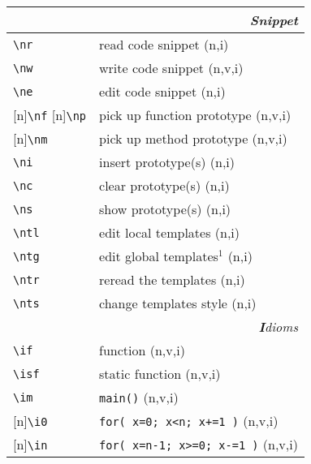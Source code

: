 \documentclass[oneside,11pt,landscape,DIV17]{scrartcl}
\newcommand{\Rep}{{\tiny{[n]}}}
\begin{document}
\begin{multicols}{3}
\begin{center}
%
\begin{tabular}[]{|p{11mm}|p{60mm}|}
\hline
\multicolumn{2}{|r|}{\textsl{S\textbf{n}ippet}} \\
\hline     \verb'\nr'  & read code snippet         \hfill (n,i)\\
\hline     \verb'\nw'  & write code snippet        \hfill (n,v,i)\\
\hline     \verb'\ne'  & edit code snippet         \hfill (n,i)\\
\hline \Rep\verb'\nf' \Rep\verb'\np'  & pick up function prototype         \hfill (n,v,i)\\
\hline \Rep\verb'\nm'  & pick up method prototype         \hfill (n,v,i)\\
\hline     \verb'\ni'  & insert prototype(s)       \hfill (n,i)\\
\hline     \verb'\nc'  & clear  prototype(s)       \hfill (n,i)\\
\hline     \verb'\ns'  & show   prototype(s)       \hfill (n,i)\\
%
\hline \verb'\ntl' & edit local templates      \hfill (n,i)\\
\hline \verb'\ntg' & edit global templates$^1$ \hfill (n,i)\\
\hline \verb'\ntr' & reread the templates      \hfill (n,i)\\
\hline \verb'\nts' & change templates style    \hfill (n,i)\\
\hline
\hline
\multicolumn{2}{|r|}{\textsl{\textbf{I}dioms}}   \\
\hline \verb'\if'  & function                         \hfill (n,v,i)\\
\hline \verb'\isf' & static function                  \hfill (n,v,i)\\
\hline \verb'\im'  & \verb'main()'                    \hfill (n,v,i)\\
\hline \Rep\verb'\i0'  & \verb'for( x=0; x<n; x+=1 )'     \hfill (n,v,i)\\
\hline \Rep\verb'\in'  & \verb'for( x=n-1; x>=0; x-=1 )'  \hfill (n,v,i)\\

\end{tabular}
\end{center}
\end{multicols}
\end{document}
